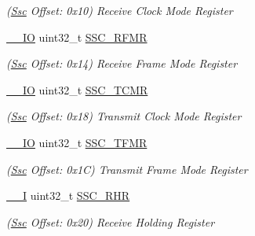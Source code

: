 \begin{DoxyCompactItemize}
\begin{DoxyCompactList}\small\item\em (\mbox{\hyperlink{structSsc}{Ssc}} Offset\+: 0x10) Receive Clock Mode Register \end{DoxyCompactList}\item 
\mbox{\label{structSsc_a4f8af45d30b9df1ac42270b97d03a25c}} 
\mbox{\hyperlink{core__cm7_8h_aec43007d9998a0a0e01faede4133d6be}{\+\_\+\+\_\+\+IO}} uint32\+\_\+t \mbox{\hyperlink{structSsc_a4f8af45d30b9df1ac42270b97d03a25c}{S\+S\+C\+\_\+\+R\+F\+MR}}
\begin{DoxyCompactList}\small\item\em (\mbox{\hyperlink{structSsc}{Ssc}} Offset\+: 0x14) Receive Frame Mode Register \end{DoxyCompactList}\item 
\mbox{\label{structSsc_a83c90b00a7e5a2c3debf0527480412fe}} 
\mbox{\hyperlink{core__cm7_8h_aec43007d9998a0a0e01faede4133d6be}{\+\_\+\+\_\+\+IO}} uint32\+\_\+t \mbox{\hyperlink{structSsc_a83c90b00a7e5a2c3debf0527480412fe}{S\+S\+C\+\_\+\+T\+C\+MR}}
\begin{DoxyCompactList}\small\item\em (\mbox{\hyperlink{structSsc}{Ssc}} Offset\+: 0x18) Transmit Clock Mode Register \end{DoxyCompactList}\item 
\mbox{\label{structSsc_a629eac5a799d4d05627a3bb22adeac42}} 
\mbox{\hyperlink{core__cm7_8h_aec43007d9998a0a0e01faede4133d6be}{\+\_\+\+\_\+\+IO}} uint32\+\_\+t \mbox{\hyperlink{structSsc_a629eac5a799d4d05627a3bb22adeac42}{S\+S\+C\+\_\+\+T\+F\+MR}}
\begin{DoxyCompactList}\small\item\em (\mbox{\hyperlink{structSsc}{Ssc}} Offset\+: 0x1C) Transmit Frame Mode Register \end{DoxyCompactList}\item 
\mbox{\label{structSsc_aeca086ddf1a55ee91daa8734c1e79f77}} 
\mbox{\hyperlink{core__cm7_8h_af63697ed9952cc71e1225efe205f6cd3}{\+\_\+\+\_\+I}} uint32\+\_\+t \mbox{\hyperlink{structSsc_aeca086ddf1a55ee91daa8734c1e79f77}{S\+S\+C\+\_\+\+R\+HR}}
\begin{DoxyCompactList}\small\item\em (\mbox{\hyperlink{structSsc}{Ssc}} Offset\+: 0x20) Receive Holding Register \end{DoxyCompactList}\item 

\end{DoxyCompactItemize}
